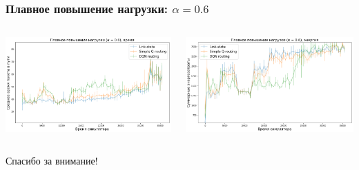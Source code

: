 \documentclass{beamer}
\begin{document}
\begin{frame}
  \frametitle{Плавное повышение нагрузки: $\alpha = 0.6$}
  \begin{columns}
    \begin{column}{0.5\textwidth}
      \includegraphics[width=\textwidth]{experiment-conveyors-a06-time}
    \end{column}
    \begin{column}{0.5\textwidth}
      \includegraphics[width=\textwidth]{experiment-conveyors-a06-energy}
    \end{column}
  \end{columns}
\end{frame}


\begin{frame}
  \begin{center}
    {\Huge Спасибо за внимание!}
  \end{center}
\end{frame}
\end{document}
